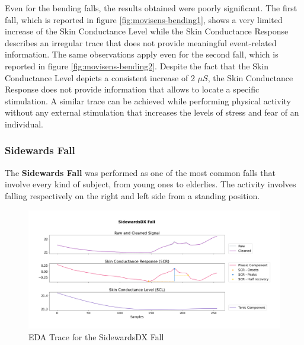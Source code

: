 \vspace{15mm}
Even for the bending falls, the results obtained were poorly significant. The first fall, which is reported in figure \ref{fig:movisens-bending1}, shows a very limited increase of the Skin Conductance Level while the Skin Conductance Response describes an irregular trace that does not provide meaningful event-related information. The same observations apply even for the second fall, which is reported in figure \ref{fig:movisens-bending2}. Despite the fact that the Skin Conductance Level depicts a consistent increase of 2 $\mu S$, the Skin Conductance Response does not provide information that allows to locate a specific stimulation. A similar trace can be achieved while performing physical activity without any external stimulation that increases the levels of stress and fear of an individual.

\newpage

\subsubsection{Sidewards Fall}\label{subsubsec:sidewards-fall}

The \textbf{Sidewards Fall} was performed as one of the most common falls that involve every kind of subject, from young ones to elderlies. The activity involves falling respectively on the right and left side from a standing position.

\begin{figure}[h!]
    \centering
    \includegraphics[width=\textwidth]{./images/movisens/SidewardsDX.png}
    \caption{EDA Trace for the SidewardsDX Fall}
    \label{fig:movisens-sidewardsdx}
\end{figure}

